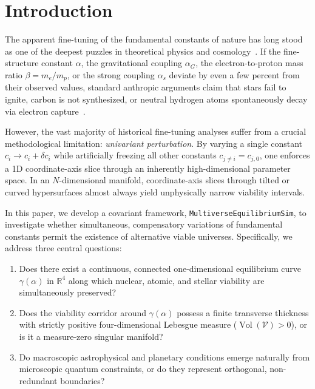 \documentclass[aps,prd,twocolumn,superscriptaddress,nofootinbib,floatfix]{revtex4-2}
\begin{document}
\maketitle

\section{Introduction}
\label{sec:intro}

The apparent fine-tuning of the fundamental constants of nature has long stood as one of the deepest puzzles in theoretical physics and cosmology~\cite{BarrowTipler1986,Hogan2000,Barnes2012}. If the fine-structure constant $\alpha$, the gravitational coupling $\alpha_G$, the electron-to-proton mass ratio $\beta = m_e/m_p$, or the strong coupling $\alpha_s$ deviate by even a few percent from their observed values, standard anthropic arguments claim that stars fail to ignite, carbon is not synthesized, or neutral hydrogen atoms spontaneously decay via electron capture~\cite{Hoyle1954,Epelbaum2013,Adams2008}.

However, the vast majority of historical fine-tuning analyses suffer from a crucial methodological limitation: \textit{univariant perturbation}. By varying a single constant $c_i \to c_i + \delta c_i$ while artificially freezing all other constants $c_{j \neq i} = c_{j,0}$, one enforces a 1D coordinate-axis slice through an inherently high-dimensional parameter space. In an $N$-dimensional manifold, coordinate-axis slices through tilted or curved hypersurfaces almost always yield unphysically narrow viability intervals.

In this paper, we develop a covariant framework, \texttt{MultiverseEquilibriumSim}, to investigate whether simultaneous, compensatory variations of fundamental constants permit the existence of alternative viable universes. Specifically, we address three central questions:
\begin{enumerate}
    \item Does there exist a continuous, connected one-dimensional equilibrium curve $\gamma(\alpha)$ in $\mathbb{R}^4$ along which nuclear, atomic, and stellar viability are simultaneously preserved?
    \item Does the viability corridor around $\gamma(\alpha)$ possess a finite transverse thickness with strictly positive four-dimensional Lebesgue measure ($\operatorname{Vol}(\mathcal{V}) > 0$), or is it a measure-zero singular manifold?
    \item Do macroscopic astrophysical and planetary conditions emerge naturally from microscopic quantum constraints, or do they represent orthogonal, non-redundant boundaries?
\end{enumerate}
\end{document}
